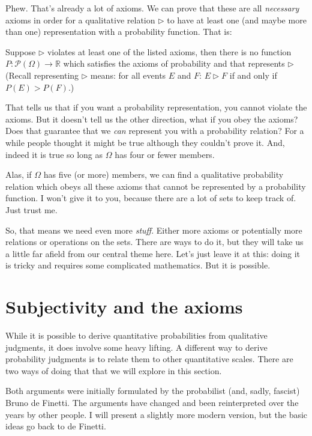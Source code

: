 Phew.  That's already a lot of axioms. We can prove that these are all {\it necessary} axioms in order for a qualitative relation $\triangleright$ to have at least one (and maybe more than one) representation with a probability function.  That is:

\begin{proposition}
    Suppose $\triangleright$ violates at least one of the listed axioms, then there is no function $P: \mathscr{P}(\Omega) \to \mathbb{R}$ which satisfies the axioms of probability and that represents $\triangleright$  (Recall representing $\triangleright$ means: for all events $E$ and $F$: $E \triangleright F$ if and only if $P(E) > P(F)$.)
\end{proposition}

That tells us that if you want a probability representation, you cannot violate the axioms.  But it doesn't tell us the other direction, what if you obey the axioms?  Does that guarantee that we {\it can} represent you with a probability relation?  For a while people thought it might be true although they couldn't prove it.  And, indeed it is true so long as $\Omega$ has four or fewer members.  

Alas, if $\Omega$ has five (or more) members, we can find a qualitative probability relation which obeys all these axioms that cannot be represented by a probability function. I won't give it to you, because there are a lot of sets to keep track of.  Just trust me.

So, that means we need even more {\it stuff}.  Either more axioms or potentially more relations or operations on the sets.  There are ways to do it, but they will take us a little far afield from our central theme here.  Let's just leave it at this: doing it is tricky and requires some complicated mathematics. But it is possible.

\section{Subjectivity and the axioms}

While it is possible to derive quantitative probabilities from qualitative judgments, it does involve some heavy lifting.  A different way to derive probability judgments is to relate them to other quantitative scales.  There are two ways of doing that that we will explore in this section.

Both arguments were initially formulated by the probabilist (and, sadly, fascist) Bruno de Finetti. The arguments have changed and been reinterpreted over the years by other people.  I will present a slightly more modern version, but the basic ideas go back to de Finetti.

